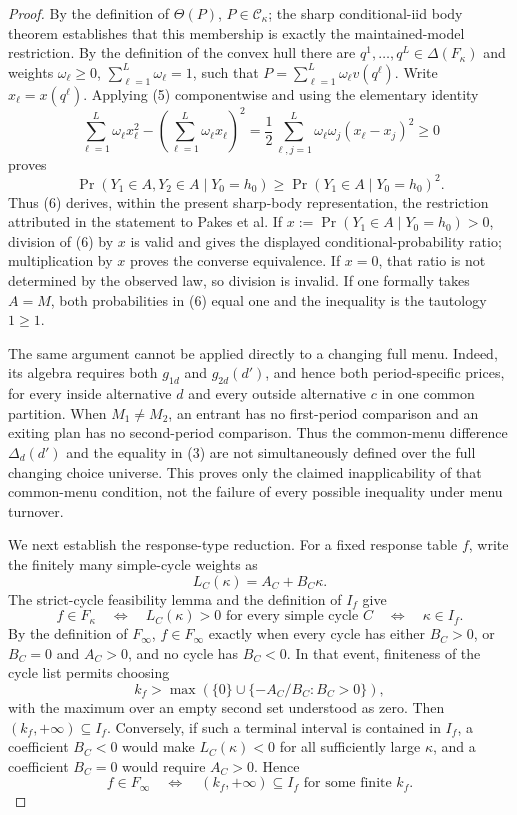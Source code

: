\documentclass{article}
\begin{document}
\begin{proof}
By the definition of \(\Theta(P)\), \(P\in\mathcal C_\kappa\); the sharp conditional-iid body theorem establishes that this membership is exactly the maintained-model restriction.  By the definition of the convex hull there are \(q^1,\ldots,q^L\in\Delta(F_\kappa)\) and weights \(\omega_\ell\ge0\), \(\sum_{\ell=1}^L\omega_\ell=1\), such that
\(P=\sum_{\ell=1}^L\omega_\ell v(q^\ell)\).  Write \(x_\ell=x(q^\ell)\).  Applying (5) componentwise and using the elementary identity
\[
 \sum_{\ell=1}^L\omega_\ell x_\ell^2-
 \left(\sum_{\ell=1}^L\omega_\ell x_\ell\right)^2
 =\frac12\sum_{\ell,j=1}^L
   \omega_\ell\omega_j(x_\ell-x_j)^2\ge0
\]
proves
\[
 \Pr(Y_1\in A,Y_2\in A\mid Y_0=h_0)
 \ge
 \Pr(Y_1\in A\mid Y_0=h_0)^2.
\tag{6}
\]
Thus (6) derives, within the present sharp-body representation, the restriction attributed in the statement to Pakes et al.  If
\(x:=\Pr(Y_1\in A\mid Y_0=h_0)>0\), division of (6) by \(x\) is valid and gives the displayed conditional-probability ratio; multiplication by \(x\) proves the converse equivalence.  If \(x=0\), that ratio is not determined by the observed law, so division is invalid.  If one formally takes \(A=M\), both probabilities in (6) equal one and the inequality is the tautology \(1\ge1\).

The same argument cannot be applied directly to a changing full menu.  Indeed, its algebra requires both \(g_{1d}\) and \(g_{2d}(d')\), and hence both period-specific prices, for every inside alternative \(d\) and every outside alternative \(c\) in one common partition.  When \(M_1\ne M_2\), an entrant has no first-period comparison and an exiting plan has no second-period comparison.  Thus the common-menu difference \(\Delta_d(d')\) and the equality in (3) are not simultaneously defined over the full changing choice universe.  This proves only the claimed inapplicability of that common-menu condition, not the failure of every possible inequality under menu turnover.

We next establish the response-type reduction.  For a fixed response table \(f\), write the finitely many simple-cycle weights as
\[
 L_C(\kappa)=A_C+B_C\kappa.
\]
The strict-cycle feasibility lemma and the definition of \(I_f\) give
\[
 f\in F_\kappa
 \quad\Longleftrightarrow\quad
 L_C(\kappa)>0\text{ for every simple cycle }C
 \quad\Longleftrightarrow\quad
 \kappa\in I_f.
\tag{7}
\]
By the definition of \(F_\infty\), \(f\in F_\infty\) exactly when every cycle has either \(B_C>0\), or \(B_C=0\) and \(A_C>0\), and no cycle has \(B_C<0\).  In that event, finiteness of the cycle list permits choosing
\[
 k_f>\max\left(\{0\}\cup
 \{-A_C/B_C:B_C>0\}\right),
\]
with the maximum over an empty second set understood as zero.  Then \((k_f,+\infty)\subseteq I_f\).  Conversely, if such a terminal interval is contained in \(I_f\), a coefficient \(B_C<0\) would make \(L_C(\kappa)<0\) for all sufficiently large \(\kappa\), and a coefficient \(B_C=0\) would require \(A_C>0\).  Hence
\[
 f\in F_\infty
 \quad\Longleftrightarrow\quad
 (k_f,+\infty)\subseteq I_f\text{ for some finite }k_f.
\tag{8}
\]


\end{proof}
\end{document}
